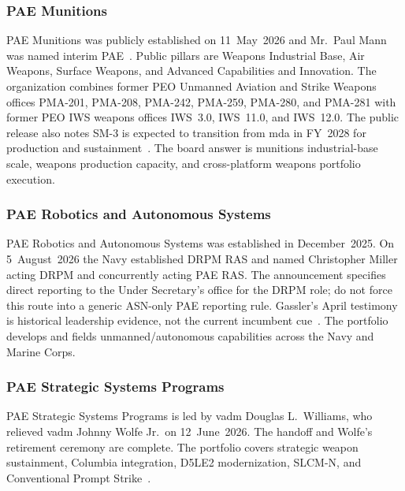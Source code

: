 \documentclass[../main.tex]{subfiles}
\begin{document}
\subsubsection{PAE Munitions}
PAE Munitions was publicly established on 11~May~2026 and Mr.\ Paul Mann was named interim PAE~\autocite{DON-PAE-Expansion-May2026,DON-PAE-Munitions-2026}. Public pillars are Weapons Industrial Base, Air Weapons, Surface Weapons, and Advanced Capabilities and Innovation. The organization combines former PEO Unmanned Aviation and Strike Weapons offices PMA-201, PMA-208, PMA-242, PMA-259, PMA-280, and PMA-281 with former PEO IWS weapons offices IWS~3.0, IWS~11.0, and IWS~12.0. The public release also notes SM-3 is expected to transition from \ac{mda} in FY~2028 for production and sustainment~\autocite{DON-PAE-Munitions-2026}. The board answer is munitions industrial-base scale, weapons production capacity, and cross-platform weapons portfolio execution.

\subsubsection{PAE Robotics and Autonomous Systems}
PAE Robotics and Autonomous Systems was established in December~2025. On 5~August~2026 the Navy established DRPM RAS and named Christopher Miller acting DRPM and concurrently acting PAE RAS. The announcement specifies direct reporting to the Under Secretary's office for the DRPM role; do not force this route into a generic ASN-only PAE reporting rule. Gassler's April testimony is historical leadership evidence, not the current incumbent cue~\autocite{DON-DRPM-RAS-Aug2026,SASC-PAE-RAS-Gassler-2026}. The portfolio develops and fields unmanned/autonomous capabilities across the Navy and Marine Corps.

\subsubsection{PAE Strategic Systems Programs}
PAE Strategic Systems Programs is led by \ac{vadm} Douglas L.\ Williams, who relieved \ac{vadm} Johnny Wolfe Jr.\ on 12~June~2026. The handoff and Wolfe's retirement ceremony are complete. The portfolio covers strategic weapon sustainment, Columbia integration, D5LE2 modernization, SLCM-N, and Conventional Prompt Strike~\autocite{DVIDS-SSP-Handoff-Jun2026}.
\end{document}
